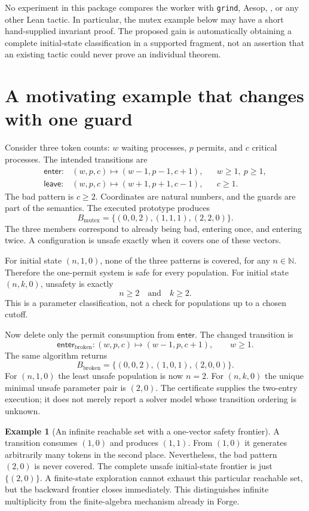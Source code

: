 \documentclass[11pt,a4paper]{article}
\newcommand{\N}{\mathbb N}
\newcommand{\code}[1]{\texttt{\detokenize{#1}}}
\newcommand{\grind}{\texttt{grind}}
\theoremstyle{definition}
\newtheorem{example}[theorem]{Example}
\theoremstyle{remark}
\begin{document}
No experiment in this package compares the worker with \grind{}, Aesop, \code{omega}, or any other Lean tactic. In particular, the mutex example below may have a short hand-supplied invariant proof. The proposed gain is automatically obtaining a complete initial-state classification in a supported fragment, not an assertion that an existing tactic could never prove an individual theorem.

\section{A motivating example that changes with one guard}\label{sec:motivation}
Consider three token counts: $w$ waiting processes, $p$ permits, and $c$ critical processes. The intended transitions are
\begin{align*}
 \mathsf{enter}:&(w,p,c)\mapsto(w-1,p-1,c+1),&&w\ge1,\ p\ge1,\\
 \mathsf{leave}:&(w,p,c)\mapsto(w+1,p+1,c-1),&&c\ge1.
\end{align*}
The bad pattern is $c\ge2$. Coordinates are natural numbers, and the guards are part of the semantics. The executed prototype produces
\begin{equation}\label{eq:mutexbasis}
 B_{\mathrm{mutex}}=\{(0,0,2),(1,1,1),(2,2,0)\}.
\end{equation}
The three members correspond to already being bad, entering once, and entering twice. A configuration is unsafe exactly when it covers one of these vectors.

For initial state $(n,1,0)$, none of the three patterns is covered, for any $n\in\N$. Therefore the one-permit system is safe for every population. For initial state $(n,k,0)$, unsafety is exactly
\[
 n\ge2\quad\text{and}\quad k\ge2.
\]
This is a parameter classification, not a check for populations up to a chosen cutoff.

Now delete only the permit consumption from $\mathsf{enter}$. The changed transition is
\[
 \mathsf{enter}_{\mathrm{broken}}:(w,p,c)\mapsto(w-1,p,c+1),\qquad w\ge1.
\]
The same algorithm returns
\[
 B_{\mathrm{broken}}=\{(0,0,2),(1,0,1),(2,0,0)\}.
\]
For $(n,1,0)$ the least unsafe population is now $n=2$. For $(n,k,0)$ the unique minimal unsafe parameter pair is $(2,0)$. The certificate supplies the two-entry execution; it does not merely report a solver model whose transition ordering is unknown.

\begin{example}[An infinite reachable set with a one-vector safety frontier]
A transition consumes $(1,0)$ and produces $(1,1)$. From $(1,0)$ it generates arbitrarily many tokens in the second place. Nevertheless, the bad pattern $(2,0)$ is never covered. The complete unsafe initial-state frontier is just $\{(2,0)\}$. A finite-state exploration cannot exhaust this particular reachable set, but the backward frontier closes immediately. This distinguishes infinite multiplicity from the finite-algebra mechanism already in Forge.
\end{example}
\end{document}
